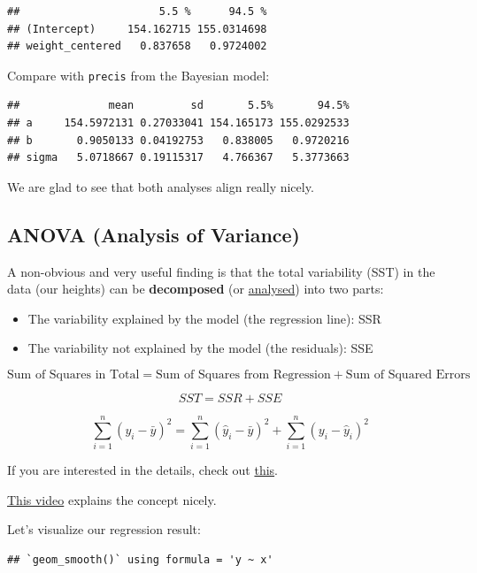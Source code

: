 \documentclass[
]{book}
\providecommand{\tightlist}{%
  \setlength{\itemsep}{0pt}\setlength{\parskip}{0pt}}
\begin{document}
\begin{verbatim}
##                      5.5 %      94.5 %
## (Intercept)     154.162715 155.0314698
## weight_centered   0.837658   0.9724002
\end{verbatim}

Compare with \texttt{precis} from the Bayesian model:

\begin{verbatim}
##              mean         sd       5.5%       94.5%
## a     154.5972131 0.27033041 154.165173 155.0292533
## b       0.9050133 0.04192753   0.838005   0.9720216
## sigma   5.0718667 0.19115317   4.766367   5.3773663
\end{verbatim}

We are glad to see that both analyses align really nicely.

\subsection{ANOVA (Analysis of Variance)}\label{analysis_of_variance}

A non-obvious and very useful finding is that the total variability (SST)
in the data (our heights) can be
\textbf{decomposed} (or \href{https://en.wiktionary.org/wiki/analysis}{analysed})
into two parts:

\begin{itemize}
\tightlist
\item
  The variability explained by the model (the regression line): SSR
\item
  The variability not explained by the model (the residuals): SSE
\end{itemize}

\[\text{Sum of Squares in Total} = \text{Sum of Squares from Regression} + \text{Sum of Squared Errors}\]

\[SST = SSR + SSE\]

\[\sum_{i=1}^{n} (y_i - \bar{y})^2 = \sum_{i=1}^{n} (\hat{y}_i - \bar{y})^2 + \sum_{i=1}^{n} (y_i - \hat{y}_i)^2\]

If you are interested in the details, check out \href{https://en.wikipedia.org/wiki/Explained_sum_of_squares\#Partitioning_in_the_general_ordinary_least_squares_model}{this}.

\href{https://www.youtube.com/watch?v=NxRTs7sXKAQ&ab_channel=365DataScience}{This video}
explains the concept nicely.

Let's visualize our regression result:

\begin{verbatim}
## `geom_smooth()` using formula = 'y ~ x'
\end{verbatim}
\end{document}
